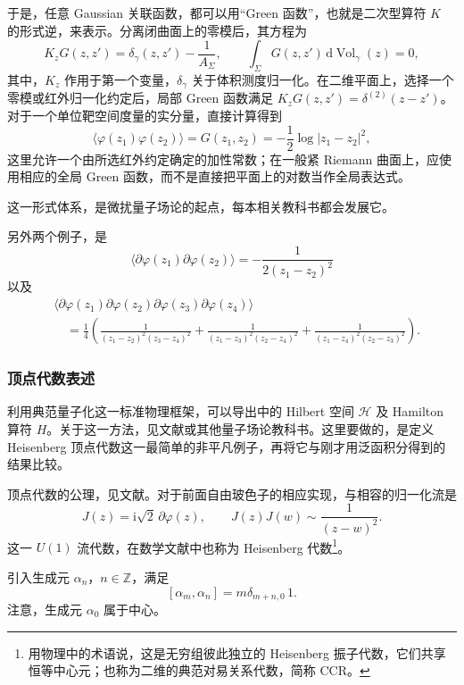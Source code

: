 于是，任意 Gaussian 关联函数，都可以用“Green 函数”，也就是二次型算符 $K$ 的形式逆，来表示。分离闭曲面上的零模后，其方程为
\[
K_zG(z,z')=\delta_\gamma(z,z')-\frac1{A_\Sigma},
\qquad
\int_\Sigma G(z,z')\,\mathrm{d}\operatorname{Vol}_\gamma(z)=0,
\]
其中，$K_z$ 作用于第一个变量，$\delta_\gamma$ 关于体积测度归一化。在二维平面上，选择一个零模或红外归一化约定后，局部 Green 函数满足 $K_zG(z,z')=\delta^{(2)}(z-z')$。对于一个单位靶空间度量的实分量，直接计算得到
\begin{equation}\label{eq:3.43}
\langle\varphi(z_1)\varphi(z_2)\rangle
=G(z_1,z_2)=-\frac12\log|z_1-z_2|^2,
\end{equation}
这里允许一个由所选红外约定确定的加性常数；在一般紧 Riemann 曲面上，应使用相应的全局 Green 函数，而不是直接把平面上的对数当作全局表达式。

这一形式体系，是微扰量子场论的起点，每本相关教科书都会发展它。
\begin{example*}
另外两个例子，是
\begin{equation}\label{eq:3.44}
\langle\partial\varphi(z_1)\partial\varphi(z_2)\rangle
=-\frac1{2(z_1-z_2)^2}
\end{equation}
以及
\begin{equation}\label{eq:3.45}
\begin{aligned}
&\langle\partial\varphi(z_1)\partial\varphi(z_2)
\partial\varphi(z_3)\partial\varphi(z_4)\rangle\\
&\quad=\frac14\left(
\frac1{(z_1-z_2)^2(z_3-z_4)^2}
+\frac1{(z_1-z_3)^2(z_2-z_4)^2}
+\frac1{(z_1-z_4)^2(z_2-z_3)^2}\right).
\end{aligned}
\end{equation}
\end{example*}

\subsubsection{顶点代数表述}\label{sec:3.2.3.2}

利用典范量子化这一标准物理框架，可以导出中的 Hilbert 空间 $\mathcal{H}$ 及 Hamilton 算符 $H$。关于这一方法，见文献或其他量子场论教科书。这里要做的，是定义 Heisenberg 顶点代数这一最简单的非平凡例子，再将它与刚才用泛函积分得到的结果比较。

顶点代数的公理，见文献。对于前面自由玻色子的相应实现，与相容的归一化流是
\[
J(z)=\mathrm{i}\sqrt2\,\partial\varphi(z),
\qquad J(z)J(w)\sim\frac1{(z-w)^2}.
\]
这一 $U(1)$ 流代数，在数学文献中也称为 Heisenberg 代数\footnote{用物理中的术语说，这是无穷组彼此独立的 Heisenberg 振子代数，它们共享恒等中心元；也称为二维的典范对易关系代数，简称 CCR。}。
\begin{definition*}\label{def:3.heisenberg-current}
引入生成元 $\alpha_n$，$n\in\mathbb{Z}$，满足
\begin{equation}\label{eq:3.46}
[\alpha_m,\alpha_n]=m\delta_{m+n,0}\,1.
\end{equation}
注意，生成元 $\alpha_0$ 属于中心。
\end{definition*}

